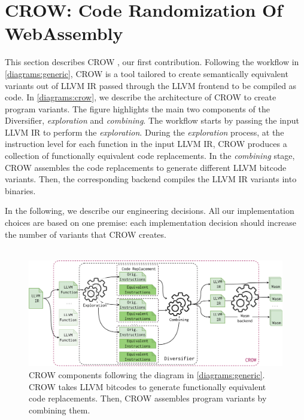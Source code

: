 
\section{CROW: Code Randomization Of WebAssembly}
\label{section:crow}


This section describes CROW \cite{CROW}, our first contribution. Following the workflow in \autoref{diagrams:generic}, CROW is a tool tailored to create semantically equivalent \wasm variants out of LLVM IR passed through the LLVM frontend to be compiled as \wasm code.
In \autoref{diagrams:crow}, we describe the architecture of CROW to create program variants.
The figure highlights the main two components of the Diversifier, \textit{exploration} and \textit{combining}. The workflow starts by passing the input LLVM IR to perform the \emph{exploration}. During the \emph{exploration} process, at the instruction level for each function in the input LLVM IR, CROW produces a collection of functionally equivalent code replacements.  
In the \emph{combining} stage, CROW assembles the code replacements to generate different LLVM bitcode variants. 
Then, the corresponding backend compiles the LLVM IR variants into \wasm binaries.

In the following, we describe our engineering decisions. All our implementation choices are based on one premise: each implementation decision should increase the number of \wasm variants that CROW creates.
\\
\\

\begin{figure}[h]
    \includegraphics[width=\linewidth]{diagrams/generation/crow.drawio.pdf}
    \caption{CROW components following the diagram in \autoref{diagrams:generic}. CROW takes LLVM bitcodes to generate functionally equivalent code replacements. Then, CROW assembles program variants by combining them.}
    \label{diagrams:crow}
\end{figure}


